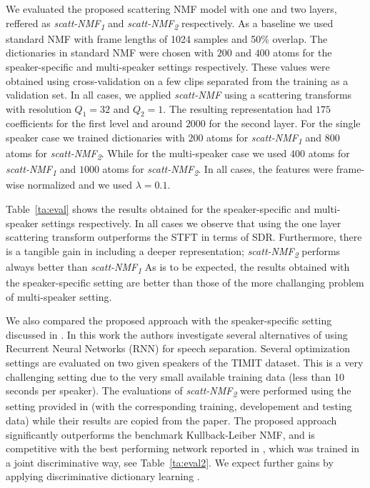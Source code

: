  We evaluated the proposed scattering NMF model with one and two layers, reffered
as \emph{scatt-NMF\textsubscript{1}} and \emph{scatt-NMF\textsubscript{2}} respectively. As a baseline we used standard NMF 
with frame lengths of 1024 samples and 50\% overlap. 
%
The dictionaries in standard NMF were chosen with $200$ and $400$ atoms for the speaker-specific and multi-speaker
settings respectively. These values were obtained using cross-validation on a few clips separated from the training as a validation set.
%
In all cases, we applied \emph{scatt-NMF} using a scattering transforms with resolution $Q_1= 32$ and $Q_2=1$.
The resulting representation had $175$ coefficients for the first level and around $2000$ for the second layer. 
%
For the single speaker case we trained dictionaries with $200$ atoms for \emph{scatt-NMF\textsubscript{1}}  and $800$ atoms for \emph{scatt-NMF\textsubscript{2}}.
While for the multi-speaker case we used $400$ atoms for \emph{scatt-NMF\textsubscript{1}}  and $1000$ atoms for \emph{scatt-NMF\textsubscript{2}}.
In all cases, the features were frame-wise normalized and we used $\lambda=0.1$. 
%
%

 Table~\ref{ta:eval} shows the results obtained for the speaker-specific and multi-speaker settings respectively.
In all cases we observe that using the one layer scattering transform outperforms the STFT in terms of SDR.
Furthermore, there is a tangible gain in including a deeper representation; \emph{scatt-NMF\textsubscript{2}} 
performs always better than \emph{scatt-NMF\textsubscript{1}} 
As is to be expected, the results obtained with the speaker-specific setting are better than those of the more challanging problem
of multi-speaker setting. 

We also compared the proposed approach with the speaker-specific setting discussed in \cite{Huang_DNN_Separation_ICASSP2014}. In this work
the authors investigate several alternatives of using Recurrent Neural Networks (RNN) for speech separation.
Several optimization settings are evaluated on two given speakers of the TIMIT dataset. This is a very challenging setting
due to the very small available training data (less than 10 seconds per speaker). The evaluations of \emph{scatt-NMF\textsubscript{2}} were performed using the setting provided in \cite{Huang_DNN_Separation_ICASSP2014} (with the corresponding training, developement and testing data) while their results are copied from the paper.
The proposed approach significantly outperforms the benchmark Kullback-Leiber NMF, and is competitive 
with the best performing network
reported in \cite{Huang_DNN_Separation_ICASSP2014}, which was trained in a joint discriminative way, see Table~\ref{ta:eval2}.
We expect further gains by applying discriminative dictionary learning \cite{sprechmann2014supervised}.

